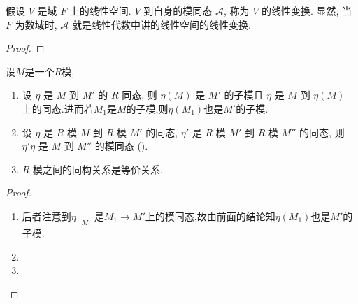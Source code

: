 \documentclass[../../main.tex]{subfiles}%
\begin{document}
\begin{example}
假设 \( V \) 是域 \( F \) 上的线性空间. \( V \) 到自身的模同态 \( \mathcal{A} \), 称为 \( V \) 的线性变换. 显然, 当 \( F \) 为数域时, \( \mathcal{A} \) 就是线性代数中讲的线性空间的线性变换.
\end{example}
\begin{proof}

\end{proof}

\begin{theorem}\label{theorem:摸同态的基本性质}
设$M$是一个$R$模,
\begin{enumerate}[(1)]
\item\label{theorem:摸同态的基本性质-1} 设 \( \eta \) 是 \( M \) 到 \( M' \) 的 \( R \) 同态, 则 \( \eta(M) \) 是 \( M' \) 的子模且 \( \eta \) 是 \( M \) 到 \( \eta(M) \) 上的同态.进而若$M_1$是$M$的子模,则$\eta(M_1)$也是$M'$的子模.

\item 设 \( \eta \) 是 \( R \) 模 \( M \) 到 \( R \) 模 \( M' \) 的同态, \( \eta' \) 是 \( R \) 模 \( M' \) 到 \( R \) 模 \( M'' \) 的同态, 则 \( \eta'\eta \) 是 \( M \) 到 \( M'' \) 的模同态 ().

\item \( R \) 模之间的同构关系是等价关系.
\end{enumerate}
\end{theorem}
\begin{figure}[H]
\centering
\caption{}
\label{figure:交换图3}
\end{figure}
\begin{proof}
\begin{enumerate}[(1)]
\item 后者注意到$\eta\mid_{M_1}$是$M_1\to M'$上的模同态,故由前面的结论知$\eta(M_1)$也是$M'$的子模.

\item 

\item 
\end{enumerate}
\end{proof}
\end{document}
